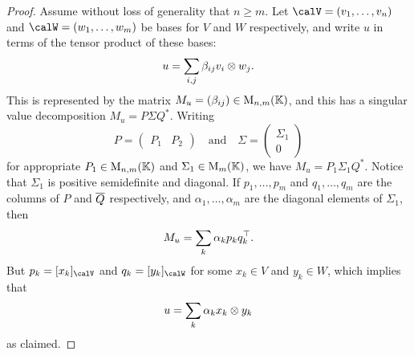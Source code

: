 \begin{proof}
    Assume without loss of generality that $n \geq m$. Let $\calV = (v_1, \ldots, v_n)$ and $\calW = (w_1, \ldots, w_m)$ be bases for $V$ and $W$ respectively, and write $u$ in terms of the tensor product of these bases:
    \begin{equation*}
        u = \sum_{i,j} \beta_{ij} v_i \otimes w_j.
    \end{equation*}
    This is represented by the matrix $M_u = (\beta_{ij}) \in \mathrm{M}_{n,m}(\mathbb{K})$, and this has a singular value decomposition $M_u = P \Sigma Q^*$. Writing
    \begin{equation*}
        P =
        \begin{pmatrix}
            P_1 & P_2
        \end{pmatrix}
        \quad \text{and} \quad
        \Sigma =
        \begin{pmatrix}
            \Sigma_1 \\
            0
        \end{pmatrix}
    \end{equation*}
    for appropriate $P_1 \in \mathrm{M}_{n,m}(\mathbb{K})$ and $\Sigma_1 \in \mathrm{M}_{m}(\mathbb{K})$, we have $M_u = P_1 \Sigma_1 Q^*$. Notice that $\Sigma_1$ is positive semidefinite and diagonal. If $p_1, \ldots, p_m$ and $q_1, \ldots, q_m$ are the columns of $P$ and $\overline{Q}$ respectively, and $\alpha_1, \ldots, \alpha_m$ are the diagonal elements of $\Sigma_1$, then
    \begin{equation*}
        M_u
            = \sum_k \alpha_k p_k q_k^\top.
    \end{equation*}
    But $p_k = \coordvec{x_k}{\calV}$ and $q_k = \coordvec{y_k}{\calW}$ for some $x_k \in V$ and $y_k \in W$, which implies that
    \begin{equation*}
        u = \sum_k \alpha_k x_k \otimes y_k
    \end{equation*}
    as claimed.
\end{proof}